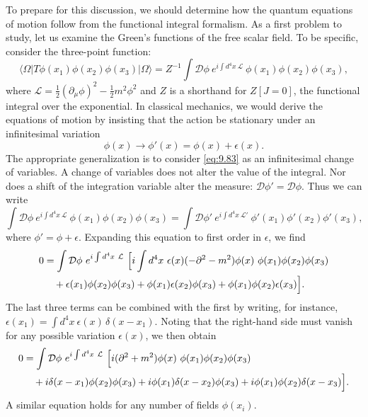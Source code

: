To prepare for this discussion, we should determine how the quantum equations
of motion follow from the functional integral formalism.  As a first problem
to study, let us examine the Green's functions of the free scalar field.  To
be specific, consider the three-point function:
\begin{equation}
  \langle\Omega|T\phi(x_1)\phi(x_2)\phi(x_3)|\Omega\rangle
  = Z^{-1}\int \mathcal{D}\phi\ e^{i\int d^4x\ \mathcal{L}}\
    \phi(x_1)\phi(x_2)\phi(x_3) ,
  \label{eq:9.82}
\end{equation}
where $\mathcal{L} = \tfrac{1}{2}(\partial_\mu\phi)^2 - \tfrac{1}{2}m^2\phi^2$
and $Z$ is a shorthand for $Z[J=0]$, the functional integral over the
exponential.  In classical mechanics, we would derive the equations of motion
by insisting that the action be stationary under an infinitesimal variation
\begin{equation}
  \phi(x) \to \phi'(x) = \phi(x) + \epsilon(x) .
  \label{eq:9.83}
\end{equation}
The appropriate generalization is to consider \eqref{eq:9.83} as an
infinitesimal change of variables.  A change of variables does not alter the
value of the integral.  Nor does a shift of the integration variable alter the
measure: $\mathcal{D}\phi' = \mathcal{D}\phi$.  Thus we can write
\begin{equation}
  \int \mathcal{D}\phi\ e^{i\int d^4x\ \mathcal{L}}\ \phi(x_1)\phi(x_2)
    \phi(x_3) = \int \mathcal{D}\phi'\ e^{i\int d^4x\ \mathcal{L}'}\
    \phi'(x_1)\phi'(x_2)\phi'(x_3) ,
\end{equation}
where $\phi' = \phi + \epsilon$.  Expanding this equation to first order in
$\epsilon$, we find
\begin{equation}
  \begin{aligned}
    0 &= \int \mathcal{D}\phi\ e^{i\int d^4x\ \mathcal{L}}\ \Bigl[
      i\int d^4x\ \epsilon(x)(-\partial^2-m^2)\phi(x)\ \phi(x_1)\phi(x_2)
        \phi(x_3)\\
    &\quad + \epsilon(x_1)\phi(x_2)\phi(x_3) + \phi(x_1)\epsilon(x_2)\phi(x_3)
      + \phi(x_1)\phi(x_2)\epsilon(x_3) \Bigr] .
  \end{aligned}
  \label{eq:9.84}
\end{equation}
The last three terms can be combined with the first by writing, for instance,
$\epsilon(x_1) = \int d^4x\ \epsilon(x)\,\delta(x-x_1)$.  Noting that the
right-hand side must vanish for any possible variation $\epsilon(x)$, we then
obtain
\begin{equation}
  \begin{aligned}
    0 &= \int \mathcal{D}\phi\ e^{i\int d^4x\ \mathcal{L}}\ \Bigl[
      i(\partial^2+m^2)\phi(x)\ \phi(x_1)\phi(x_2)\phi(x_3)\\
    &\quad + i\delta(x-x_1)\phi(x_2)\phi(x_3) + i\phi(x_1)\delta(x-x_2)
      \phi(x_3) + i\phi(x_1)\phi(x_2)\delta(x-x_3) \Bigr] .
  \end{aligned}
  \label{eq:9.85}
\end{equation}
A similar equation holds for any number of fields $\phi(x_i)$.

